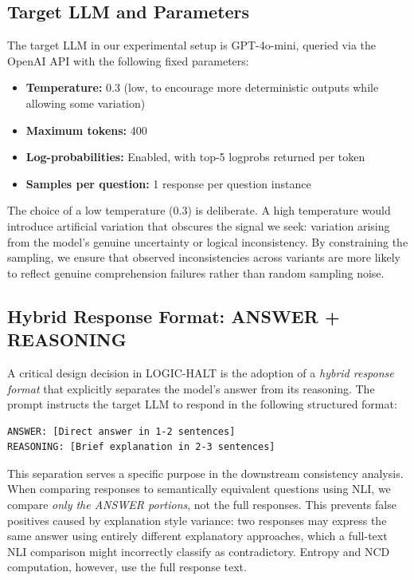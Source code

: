 \subsection{Target LLM and Parameters}

The target LLM in our experimental setup is GPT-4o-mini, queried via the OpenAI API with the following fixed parameters:

\begin{itemize}
    \item \textbf{Temperature:} 0.3 (low, to encourage more deterministic outputs while allowing some variation)
    \item \textbf{Maximum tokens:} 400
    \item \textbf{Log-probabilities:} Enabled, with top-5 logprobs returned per token
    \item \textbf{Samples per question:} 1 response per question instance
\end{itemize}

\noindent
The choice of a low temperature (0.3) is deliberate. A high temperature would introduce artificial variation that obscures the signal we seek: variation arising from the model's genuine uncertainty or logical inconsistency. By constraining the sampling, we ensure that observed inconsistencies across variants are more likely to reflect genuine comprehension failures rather than random sampling noise.

\subsection{Hybrid Response Format: ANSWER + REASONING}

A critical design decision in LOGIC-HALT is the adoption of a \emph{hybrid response format} that explicitly separates the model's answer from its reasoning. The prompt instructs the target LLM to respond in the following structured format:

\begin{verbatim}
ANSWER: [Direct answer in 1-2 sentences]
REASONING: [Brief explanation in 2-3 sentences]
\end{verbatim}

\noindent
This separation serves a specific purpose in the downstream consistency analysis. When comparing responses to semantically equivalent questions using NLI, we compare \emph{only the ANSWER portions}, not the full responses. This prevents false positives caused by explanation style variance: two responses may express the same answer using entirely different explanatory approaches, which a full-text NLI comparison might incorrectly classify as contradictory. Entropy and NCD computation, however, use the full response text.


